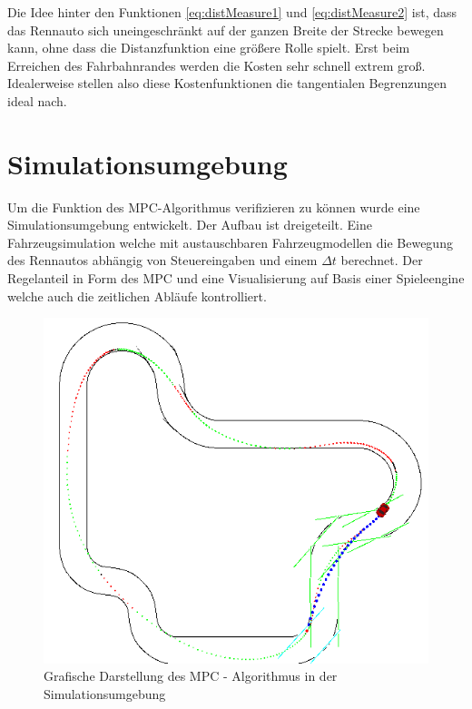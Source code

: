\documentclass{like}
\begin{document}
Die Idee hinter den Funktionen \ref{eq:distMeasure1} und \ref{eq:distMeasure2} ist, dass das Rennauto sich uneingeschränkt auf der ganzen Breite der Strecke bewegen kann, ohne dass die Distanzfunktion eine größere Rolle spielt. Erst beim Erreichen des Fahrbahnrandes werden die Kosten sehr schnell extrem groß. Idealerweise stellen also diese Kostenfunktionen die tangentialen Begrenzungen ideal nach. 



\chapter{Simulationsumgebung}
Um die Funktion des \ac{MPC}-Algorithmus verifizieren zu können wurde eine Simulationsumgebung entwickelt. Der Aufbau ist dreigeteilt. Eine Fahrzeugsimulation welche mit austauschbaren Fahrzeugmodellen die Bewegung des Rennautos abhängig von Steuereingaben und einem $\Delta t$ berechnet. Der Regelanteil in Form des \ac{MPC} und eine Visualisierung auf Basis einer Spieleengine welche auch die zeitlichen Abläufe kontrolliert. 


\begin{figure}[ht!]
	\centering
	\includegraphics[width=350pt]{Abbildungen/sim_visual.png}
	\caption{Grafische Darstellung des MPC - Algorithmus in der Simulationsumgebung}
	\label{fig:jumpDiagram}
\end{figure}
\end{document}
